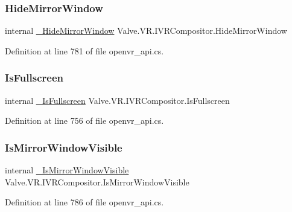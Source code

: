 \subsubsection{\texorpdfstring{HideMirrorWindow}{HideMirrorWindow}}
{\footnotesize\ttfamily internal \mbox{\hyperlink{struct_valve_1_1_v_r_1_1_i_v_r_compositor_ae7894fcd457855bc576170f3ef45a658}{\+\_\+\+Hide\+Mirror\+Window}} Valve.\+V\+R.\+I\+V\+R\+Compositor.\+Hide\+Mirror\+Window}



Definition at line 781 of file openvr\+\_\+api.\+cs.

\mbox{\label{struct_valve_1_1_v_r_1_1_i_v_r_compositor_a7cae2a894784dd0fb2302e20d60e7ff8}} 
\subsubsection{\texorpdfstring{IsFullscreen}{IsFullscreen}}
{\footnotesize\ttfamily internal \mbox{\hyperlink{struct_valve_1_1_v_r_1_1_i_v_r_compositor_a860925c25ba19ea99a70ab8b080fc57e}{\+\_\+\+Is\+Fullscreen}} Valve.\+V\+R.\+I\+V\+R\+Compositor.\+Is\+Fullscreen}



Definition at line 756 of file openvr\+\_\+api.\+cs.

\mbox{\label{struct_valve_1_1_v_r_1_1_i_v_r_compositor_a6fc49d73e29d2dead001115ec3a6e8cc}} 
\subsubsection{\texorpdfstring{IsMirrorWindowVisible}{IsMirrorWindowVisible}}
{\footnotesize\ttfamily internal \mbox{\hyperlink{struct_valve_1_1_v_r_1_1_i_v_r_compositor_a709b0f249fd12044c3c24298e0794585}{\+\_\+\+Is\+Mirror\+Window\+Visible}} Valve.\+V\+R.\+I\+V\+R\+Compositor.\+Is\+Mirror\+Window\+Visible}



Definition at line 786 of file openvr\+\_\+api.\+cs.


